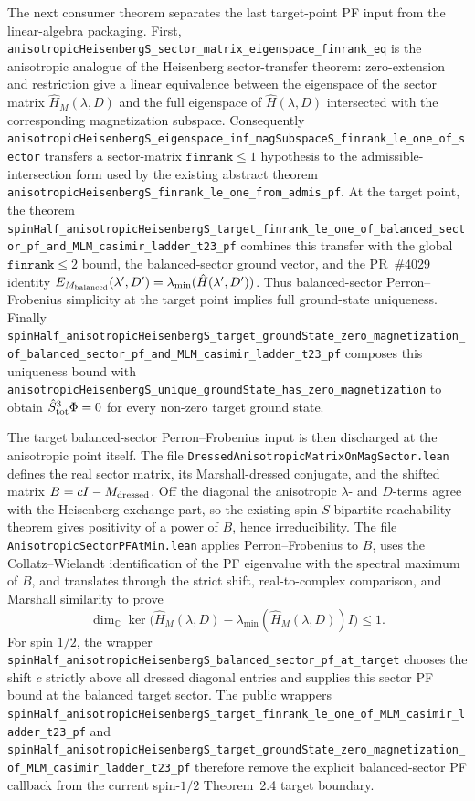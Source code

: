 \documentclass[a4paper,11pt]{article}
\begin{document}
The next consumer theorem separates the last target-point PF input from the
linear-algebra packaging.  First,
\texttt{anisotropicHeisenbergS\_sector\_matrix\_eigenspace\_finrank\_eq} is the
anisotropic analogue of the Heisenberg sector-transfer theorem: zero-extension
and restriction give a linear equivalence between the eigenspace of the sector
matrix \(\hat H_M(\lambda,D)\) and the full eigenspace of
\(\hat H(\lambda,D)\) intersected with the corresponding magnetization
subspace.  Consequently
\texttt{anisotropicHeisenbergS\_eigenspace\_inf\_magSubspaceS\_finrank\_le\_one\_of\_sector}
transfers a sector-matrix \( \texttt{finrank}\le 1 \) hypothesis to the
admissible-intersection form used by the existing abstract theorem
\texttt{anisotropicHeisenbergS\_finrank\_le\_one\_from\_admis\_pf}.
At the target point, the theorem
\texttt{spinHalf\_anisotropicHeisenbergS\_target\_finrank\_le\_one\_of\_balanced\_sector\_pf\_and\_MLM\_casimir\_ladder\_t23\_pf}
combines this transfer with the global \( \texttt{finrank}\le 2 \) bound, the
balanced-sector ground vector, and the PR~\#4029 identity
\(E_{M_{\rm balanced}}(\lambda',D')=\lambda_{\min}(\hat H(\lambda',D'))\).
Thus balanced-sector Perron--Frobenius simplicity at the target point implies
full ground-state uniqueness.  Finally
\texttt{spinHalf\_anisotropicHeisenbergS\_target\_groundState\_zero\_magnetization\_of\_balanced\_sector\_pf\_and\_MLM\_casimir\_ladder\_t23\_pf}
composes this uniqueness bound with
\texttt{anisotropicHeisenbergS\_unique\_groundState\_has\_zero\_magnetization}
to obtain \(\hat S^3_{\rm tot}\Phi=0\) for every non-zero target ground state.

The target balanced-sector Perron--Frobenius input is then discharged at the
anisotropic point itself.  The file
\texttt{DressedAnisotropicMatrixOnMagSector.lean} defines the real
sector matrix, its Marshall-dressed conjugate, and the shifted matrix
\(B=cI-M_{\rm dressed}\).  Off the diagonal the anisotropic \(\lambda\)- and
\(D\)-terms agree with the Heisenberg exchange part, so the existing spin-\(S\)
bipartite reachability theorem gives positivity of a power of \(B\), hence
irreducibility.  The file \texttt{AnisotropicSectorPFAtMin.lean} applies
Perron--Frobenius to \(B\), uses the Collatz--Wielandt identification of the
PF eigenvalue with the spectral maximum of \(B\), and translates through the
strict shift, real-to-complex comparison, and Marshall similarity to prove
\[
  \dim_{\mathbb C}\ker
  \bigl(\hat H_M(\lambda,D)-\lambda_{\min}(\hat H_M(\lambda,D))I\bigr)
  \le 1 .
\]
For spin \(1/2\), the wrapper
\texttt{spinHalf\_anisotropicHeisenbergS\_balanced\_sector\_pf\_at\_target}
chooses the shift \(c\) strictly above all dressed diagonal entries and supplies
this sector PF bound at the balanced target sector.  The public wrappers
\texttt{spinHalf\_anisotropicHeisenbergS\_target\_finrank\_le\_one\_of\_MLM\_casimir\_ladder\_t23\_pf}
and
\texttt{spinHalf\_anisotropicHeisenbergS\_target\_groundState\_zero\_magnetization\_of\_MLM\_casimir\_ladder\_t23\_pf}
therefore remove the explicit balanced-sector PF callback from the current
spin-\(1/2\) Theorem~2.4 target boundary.
\end{document}
